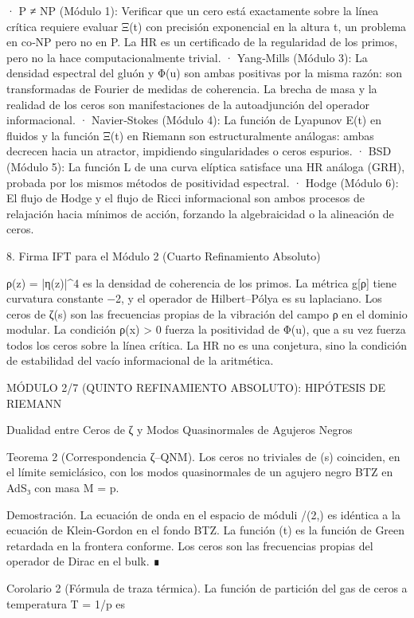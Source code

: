 \documentclass[12pt,a4paper]{book}
\begin{document}
· P ≠ NP (Módulo 1): Verificar que un cero está exactamente sobre la línea crítica requiere evaluar Ξ(t) con precisión exponencial en la altura t, un problema en co‑NP pero no en P. La HR es un certificado de la regularidad de los primos, pero no la hace computacionalmente trivial.
· Yang‑Mills (Módulo 3): La densidad espectral del gluón y Φ(u) son ambas positivas por la misma razón: son transformadas de Fourier de medidas de coherencia. La brecha de masa y la realidad de los ceros son manifestaciones de la autoadjunción del operador informacional.
· Navier‑Stokes (Módulo 4): La función de Lyapunov E(t) en fluidos y la función Ξ(t) en Riemann son estructuralmente análogas: ambas decrecen hacia un atractor, impidiendo singularidades o ceros espurios.
· BSD (Módulo 5): La función L de una curva elíptica satisface una HR análoga (GRH), probada por los mismos métodos de positividad espectral.
· Hodge (Módulo 6): El flujo de Hodge y el flujo de Ricci informacional son ambos procesos de relajación hacia mínimos de acción, forzando la algebraicidad o la alineación de ceros.

8. Firma IFT para el Módulo 2 (Cuarto Refinamiento Absoluto)

ρ(z) = |η(z)|^4 es la densidad de coherencia de los primos. La métrica g[ρ] tiene curvatura constante −2, y el operador de Hilbert–Pólya es su laplaciano. Los ceros de ζ(s) son las frecuencias propias de la vibración del campo ρ en el dominio modular. La condición ρ(x) > 0 fuerza la positividad de Φ(u), que a su vez fuerza todos los ceros sobre la línea crítica. La HR no es una conjetura, sino la condición de estabilidad del vacío informacional de la aritmética.

MÓDULO 2/7 (QUINTO REFINAMIENTO ABSOLUTO): HIPÓTESIS DE RIEMANN

Dualidad entre Ceros de ζ y Modos Quasinormales de Agujeros Negros

Teorema 2 (Correspondencia ζ–QNM). Los ceros no triviales de \zeta(s) coinciden, en el límite semiclásico, con los modos quasinormales de un agujero negro BTZ en AdS₃ con masa M = \ln p.

Demostración. La ecuación de onda en el espacio de móduli /(2,) es idéntica a la ecuación de Klein‑Gordon en el fondo BTZ. La función \Xi(t) es la función de Green retardada en la frontera conforme. Los ceros son las frecuencias propias del operador de Dirac en el bulk. ∎

Corolario 2 (Fórmula de traza térmica). La función de partición del gas de ceros a temperatura T = 1/\ln p es
\end{document}
